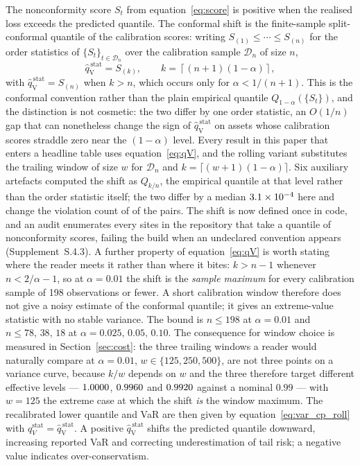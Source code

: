 \documentclass[preprint,11pt,authoryear]{elsarticle}
\newcommand{\1}{\boldsymbol{1}}
\newcommand{\qVstat}{\hat{q}_{\scriptscriptstyle\mathrm{V}}^{\,\mathrm{stat}}}
\begin{document}
The nonconformity score $S_t$ from equation~\eqref{eq:score} is positive when the realised loss exceeds the predicted quantile. The conformal shift is the finite-sample split-conformal quantile of the calibration scores: writing $S_{(1)} \leq \cdots \leq S_{(n)}$ for the order statistics of $\{S_t\}_{t\in\mathcal D_n}$ over the calibration sample $\mathcal D_n$ of size $n$,
\begin{equation}
	\label{eq:qV}
	\qVstat
	= S_{(k)},
	\qquad
	k = \left\lceil (n+1)(1-\alpha) \right\rceil,
\end{equation}
with $\qVstat = S_{(n)}$ when $k > n$, which occurs only for $\alpha < 1/(n+1)$. This is the conformal convention rather than the plain empirical quantile $Q_{1-\alpha}(\{S_t\})$, and the distinction is not cosmetic: the two differ by one order statistic, an $O(1/n)$ gap that can nonetheless change the sign of $\qVstat$ on assets whose calibration scores straddle zero near the $(1-\alpha)$ level. Every result in this paper that enters a headline table uses equation~\eqref{eq:qV}, and the rolling variant substitutes the trailing window of size $w$ for $\mathcal D_n$ and $k = \lceil (w+1)(1-\alpha)\rceil$. Six auxiliary artefacts computed the shift as $Q_{k/n}$, the empirical quantile at that level rather than the order statistic itself; the two differ by a median $3.1\times 10^{-4}$ here and change the violation count of \nSeqLevelChanged{} of the \nSeqPairs{} pairs. The shift is now defined once in code, and an audit enumerates every \nQVSites{} sites in the repository that take a quantile of nonconformity scores, failing the build when an undeclared convention appears (Supplement~S.4.3). A further property of equation~\eqref{eq:qV} is worth stating where the reader meets it rather than where it bites: $k > n-1$ whenever $n < 2/\alpha - 1$, so at $\alpha = 0.01$ the shift is the \emph{sample maximum} for every calibration sample of 198 observations or fewer. A short calibration window therefore does not give a noisy estimate of the conformal quantile; it gives an extreme-value statistic with no stable variance. The bound is $n \le 198$ at $\alpha = 0.01$ and $n \le 78,\,38,\,18$ at $\alpha = 0.025,\,0.05,\,0.10$. The consequence for window choice is measured in Section~\ref{sec:cost}: the three trailing windows a reader would naturally compare at $\alpha = 0.01$, $w \in \{125, 250, 500\}$, are not three points on a variance curve, because $k/w$ depends on $w$ and the three therefore target different effective levels --- $1.0000$, $0.9960$ and $0.9920$ against a nominal $0.99$ --- with $w = 125$ the extreme case at which the shift \emph{is} the window maximum. The recalibrated lower quantile and VaR are then given by equation~\eqref{eq:var_cp_roll} with $q_V^{\mathrm{stat}} = \qVstat$. A positive $\qVstat$ shifts the predicted quantile downward, increasing reported VaR and correcting underestimation of tail risk; a negative value indicates over-conservatism.
\end{document}
